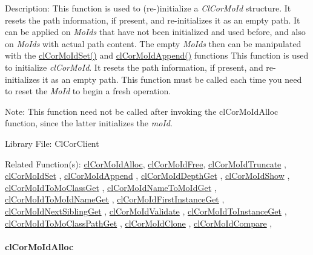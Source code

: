 \begin{Desc}
\item[Description:]This function is used to (re-)initialize a {\em Cl\-Cor\-Mo\-Id\/} structure. It resets the path information, if present, and re-initializes it as an empty path. It can be applied on {\em Mo\-Ids\/} that have not been initialized and used before, and also on {\em Mo\-Ids\/} with actual path content. The empty {\em Mo\-Ids\/} then can be manipulated with the \hyperlink{group__group13_ga111}{cl\-Cor\-Mo\-Id\-Set()} and \hyperlink{group__group13_ga112}{cl\-Cor\-Mo\-Id\-Append()} functions This function is used to initialize {\em cl\-Cor\-Mo\-Id\/}. It resets the path information, if present, and re-initializes it as an empty path. This function must be called each time you need to reset the {\em Mo\-Id\/} to begin a fresh operation. \end{Desc}
\begin{Desc}
\item[Note:]This function need not be called after invoking the cl\-Cor\-Mo\-Id\-Alloc function, since the latter initializes the {\em mo\-Id\/}.\end{Desc}
\begin{Desc}
\item[Library File:]Cl\-Cor\-Client\end{Desc}
\begin{Desc}
\item[Related Function(s):]\hyperlink{group__group13}{cl\-Cor\-Mo\-Id\-Alloc}, \hyperlink{group__group13}{cl\-Cor\-Mo\-Id\-Free}, \hyperlink{group__group13}{cl\-Cor\-Mo\-Id\-Truncate} , \hyperlink{group__group13}{cl\-Cor\-Mo\-Id\-Set} , \hyperlink{group__group13}{cl\-Cor\-Mo\-Id\-Append} , \hyperlink{group__group13}{cl\-Cor\-Mo\-Id\-Depth\-Get} , \hyperlink{group__group13}{cl\-Cor\-Mo\-Id\-Show} , \hyperlink{group__group13}{cl\-Cor\-Mo\-Id\-To\-Mo\-Class\-Get} , \hyperlink{group__group13}{cl\-Cor\-Mo\-Id\-Name\-To\-Mo\-Id\-Get} , \hyperlink{group__group13}{cl\-Cor\-Mo\-Id\-To\-Mo\-Id\-Name\-Get} , \hyperlink{group__group13}{cl\-Cor\-Mo\-Id\-First\-Instance\-Get} , \hyperlink{group__group13}{cl\-Cor\-Mo\-Id\-Next\-Sibling\-Get} , \hyperlink{group__group13}{cl\-Cor\-Mo\-Id\-Validate} , \hyperlink{group__group13}{cl\-Cor\-Mo\-Id\-To\-Instance\-Get} , \hyperlink{group__group13}{cl\-Cor\-Mo\-Id\-To\-Mo\-Class\-Path\-Get} , \hyperlink{group__group13}{cl\-Cor\-Mo\-Id\-Clone} , \hyperlink{group__group13}{cl\-Cor\-Mo\-Id\-Compare} , \end{Desc}
\hypertarget{pagecor229}{}\paragraph{cl\-Cor\-Mo\-Id\-Alloc}\label{pagecor229}
